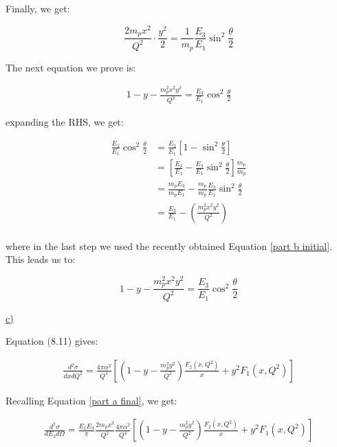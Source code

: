 \documentclass[11pt]{article}
\theoremstyle{definition}
\begin{document}
Finally, we get:

\begin{equation}\label{part b initial}
\boxed{
    \frac{2m_px^2}{Q^2} \cdot \frac{y^2}{2} = \frac{1}{m_p}\frac{E_3}{E_1}\sin^2\frac{\theta}{2} 
}
\end{equation}

The next equation we prove is:

\begin{align}
    1-y-\frac{m_p^2x^2y^2}{Q^2} = \frac{E_3}{E_1}\cos^2\frac{\theta}{2}
\end{align}

expanding the RHS, we get:

\begin{align}
    \frac{E_3}{E_1}\cos^2\frac{\theta}{2}
    &=
    \frac{E_3}{E_1}\left[1 - \sin^2\frac{\theta}{2}\right]\\
    &=\left[\frac{E_3}{E_1} - \frac{E_3}{E_1}\sin^2\frac{\theta}{2}\right]\frac{m_p}{m_p}\\
    &=\frac{m_pE_3}{m_pE_1} - \frac{m_p}{m_p}\frac{E_3}{E_1}\sin^2\frac{\theta}{2}\\
    &=\frac{E_3}{E_1} - \left(\frac{m_p^2x^2y^2}{Q^2}\right)\\
\end{align}

where in the last step we used the recently obtained Equation \ref{part b initial}. This leads us to:

\begin{equation}\label{part b final}
\boxed{
    1-y-\frac{m_p^2x^2y^2}{Q^2} = \frac{E_3}{E_1}\cos^2\frac{\theta}{2}
}
\end{equation}

\newpage
\underline{c)}

Equation (8.11) gives:

\begin{align}
    \frac{d^2\sigma}{dxdQ^2}
    =
    \frac{4\pi\alpha^2}{Q^4}
    \left[
        \left(
            1 - y - \frac{m_p^2y^2}{Q^2}
        \right)
        \frac{F_2(x,Q^2)}{x}
        +
        y^2F_1(x,Q^2)
    \right]
\end{align}

Recalling Equation \ref{part a final}, we get:

\begin{align}
    \frac{d^2\sigma}{dE_3d\Omega}
    =
    \frac{E_1E_3}{\pi}
    \frac{2m_px^2}{Q^2}
    \frac{4\pi\alpha^2}{Q^4}
    \left[
        \left(
            1 - y - \frac{m_p^2y^2}{Q^2}
        \right)
        \frac{F_2(x,Q^2)}{x}
        +
        y^2F_1(x,Q^2)
    \right]
\end{align}
\end{document}
